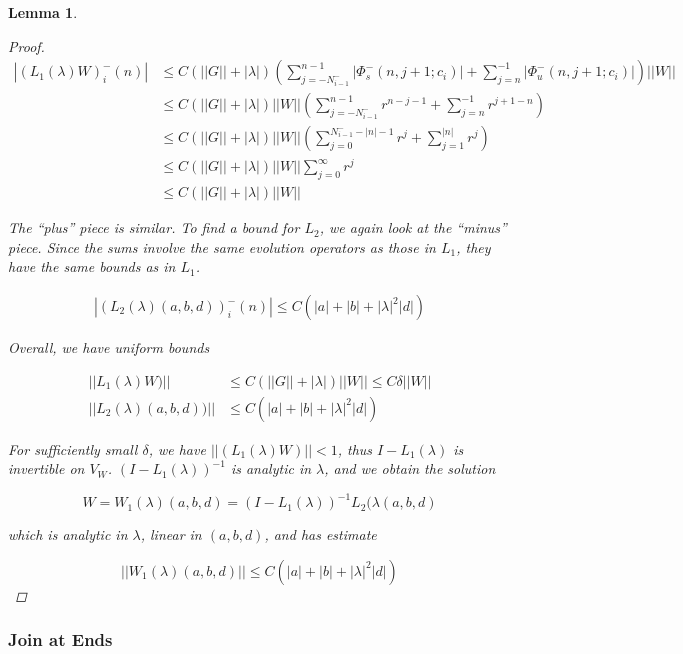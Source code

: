 \documentclass[12pt]{article}
\newtheorem{lemma}{Lemma}
\begin{document}
\begin{lemma}
\begin{proof}
\begin{align*}
|(L_1(\lambda)W)_i^-(n)| &\leq C (||G|| + |\lambda|)\left(
\sum_{j = -N_{i-1}^-}^{n-1} |\Phi_s^-(n, j+1; c_i)| + \sum_{j = n}^{-1} |\Phi_u^-(n, j+1; c_i)| \right) ||W|| \\
&\leq C (||G|| + |\lambda|) ||W||
\left( \sum_{j = -N_{i-1}^-}^{n-1} r^{n - j - 1} + \sum_{j = n}^{-1} r^{j+1-n} \right) \\
&\leq C (||G|| + |\lambda|) ||W||
\left( \sum_{j = 0}^{N_{i-1}^- -|n| -1} r^j + \sum_{j = 1}^{|n|} r^j \right) \\
&\leq C (||G|| + |\lambda|) ||W||\sum_{j = 0}^\infty r^j \\
&\leq C (||G|| + |\lambda|)||W||
\end{align*}

The ``plus'' piece is similar. To find a bound for $L_2$, we again look at the ``minus'' piece. Since the sums involve the same evolution operators as those in $L_1$, they have the same bounds as in $L_1$.

\begin{align*}
|(L_2(\lambda)(a,b,d))_i^-(n)| \leq C\left( |a| + |b| + |\lambda|^2 |d| \right)
\end{align*}

Overall, we have uniform bounds

\begin{align*}
||L_1(\lambda)W)|| &\leq C \left(||G|| + |\lambda| \right)||W|| \leq C \delta ||W|| \\
||L_2(\lambda)(a,b,d))|| &\leq C\left( |a| + |b| + |\lambda|^2 |d| \right)
\end{align*}

For sufficiently small $\delta$, we have $||(L_1(\lambda)W)|| < 1$, thus $I - L_1(\lambda)$ is invertible on $V_W$. $(I - L_1(\lambda))^{-1}$ is analytic in $\lambda$, and we obtain the solution 

\[
W = W_1(\lambda)(a,b,d) = (I - L_1(\lambda))^{-1} L_2(\lambda(a,b,d)
\]

which is analytic in $\lambda$, linear in $(a, b, d)$, and has estimate

\[
||W_1(\lambda)(a,b,d)|| \leq C \left( |a| + |b| + |\lambda|^2 |d| \right)
\]

\end{proof}
\end{lemma}

\subsubsection{Join at Ends}
\end{document}
